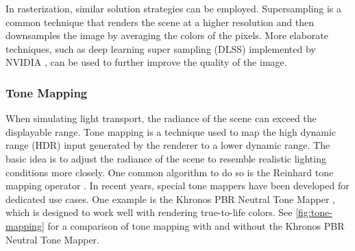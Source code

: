 In rasterization, similar solution strategies can be employed. Supersampling is a common technique that renders the scene at a higher resolution and then downsamples the image by averaging the colors of the pixels. More elaborate techniques, such as deep learning super sampling (DLSS) implemented by NVIDIA \cite{nvidiaDlss}, can be used to further improve the quality of the image.

\subsubsection{Tone Mapping}
\label{sec:toneMappingTheory}

When simulating light transport, the radiance of the scene can exceed the displayable range. Tone mapping is a technique used to map the high dynamic range (\gls{HDR}) input generated by the renderer to a lower dynamic range. The basic idea is to adjust the radiance of the scene to resemble realistic lighting conditions more closely. One common algorithm to do so is the Reinhard tone mapping operator \cite{reinhardToneMapping}. In recent years, special tone mappers have been developed for dedicated use cases. One example is the Khronos \gls{PBR} Neutral Tone Mapper \cite{pbrNeutralToneMapping}, which is designed to work well with rendering true-to-life colors. See \autoref{fig:tone-mapping} for a comparison of tone mapping with and without the Khronos \gls{PBR} Neutral Tone Mapper.

